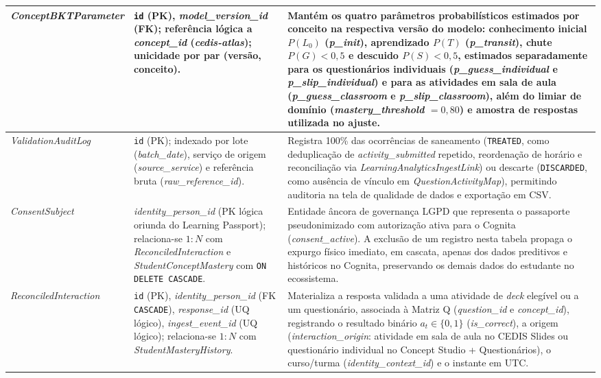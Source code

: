 {\begin{longtable}{>{\raggedright\arraybackslash}p{3.4cm}>{\raggedright\arraybackslash}p{4.2cm}>{\raggedright\arraybackslash}p{6.2cm}}
\hline
\textit{ConceptBKT\allowbreak Parameter} & \texttt{id} (PK), \textit{model\_version\_id} (FK); referência lógica a \textit{concept\_id} (\textit{cedis-atlas}); unicidade por par (versão, conceito). & Mantém os quatro parâmetros probabilísticos estimados por conceito na respectiva versão do modelo: conhecimento inicial $P(L_0)$ (\textit{p\_init}), aprendizado $P(T)$ (\textit{p\_transit}), chute $P(G) < 0{,}5$ e descuido $P(S) < 0{,}5$, estimados separadamente para os questionários individuais (\textit{p\_guess\_individual} e \textit{p\_slip\_individual}) e para as atividades em sala de aula (\textit{p\_guess\_classroom} e \textit{p\_slip\_classroom}), além do limiar de domínio (\textit{mastery\_threshold} $= 0{,}80$) e amostra de respostas utilizada no ajuste. \\
\hline
\textit{ValidationAudit\allowbreak Log} & \texttt{id} (PK); indexado por lote (\textit{batch\_date}), serviço de origem (\textit{source\_service}) e referência bruta (\textit{raw\_reference\_id}). & Registra 100\% das ocorrências de saneamento (\texttt{TREATED}, como deduplicação de \textit{activity\_submitted} repetido, reordenação de horário e reconciliação via \textit{LearningAnalyticsIngestLink}) ou descarte (\texttt{DISCARDED}, como ausência de vínculo em \textit{QuestionActivityMap}), permitindo auditoria na tela de qualidade de dados e exportação em CSV. \\
\hline
\textit{ConsentSubject} & \textit{identity\_person\_id} (PK lógica oriunda do Learning Passport); relaciona-se $1:N$ com \textit{ReconciledInteraction} e \textit{StudentConceptMastery} com \texttt{ON DELETE CASCADE}. & Entidade âncora de governança LGPD que representa o passaporte pseudonimizado com autorização ativa para o Cognita (\textit{consent\_active}). A exclusão de um registro nesta tabela propaga o expurgo físico imediato, em cascata, apenas dos dados preditivos e históricos no Cognita, preservando os demais dados do estudante no ecossistema. \\
\hline
\textit{Reconciled\allowbreak Interaction} & \texttt{id} (PK), \textit{identity\_person\_id} (FK \texttt{CASCADE}), \textit{response\_id} (UQ lógico), \textit{ingest\_event\_id} (UQ lógico); relaciona-se $1:N$ com \textit{StudentMasteryHistory}. & Materializa a resposta validada a uma atividade de \textit{deck} elegível ou a um questionário, associada à Matriz Q (\textit{question\_id} e \textit{concept\_id}), registrando o resultado binário $a_t \in \{0, 1\}$ (\textit{is\_correct}), a origem (\textit{interaction\_origin}: atividade em sala de aula no CEDIS Slides ou questionário individual no Concept Studio + Questionários), o curso/turma (\textit{identity\_context\_id}) e o instante em UTC. \\

\end{longtable}}
